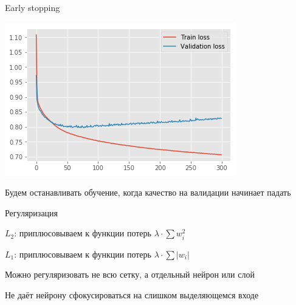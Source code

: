 \documentclass[notes,12pt, aspectratio=169]{beamer}
\newenvironment{wideitemize}{\itemize\addtolength{\itemsep}{10pt}}{\enditemize}
\begin{document}
\begin{frame}{Early stopping}
\begin{center}
	\includegraphics[width=0.5\paperwidth]{early_stopping.png}
\end{center}
\begin{wideitemize}
	\item Будем останавливать обучение, когда качество на валидации начинает падать
\end{wideitemize}
\end{frame}

\begin{frame}{Регуляризация}
\begin{wideitemize}
	\item $L_2$: приплюсовываем к функции потерь $\lambda \cdot \sum w_i^2$
	
	\item $L_1$: приплюсовываем к функции потерь $\lambda \cdot \sum |w_i|$
	
	\item Можно регуляризовать не всю сетку, а отдельный нейрон или слой 
	
	\item Не даёт нейрону сфокусироваться на слишком выделяющемся входе	
\end{wideitemize}
\end{frame}
\end{document}
